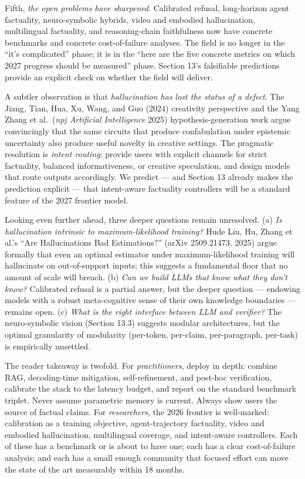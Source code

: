 Fifth, \emph{the open problems have sharpened}. Calibrated refusal, long-horizon agent factuality, neuro-symbolic hybrids, video and embodied hallucination, multilingual factuality, and reasoning-chain faithfulness now have concrete benchmarks and concrete cost-of-failure analyses. The field is no longer in the ``it's complicated'' phase; it is in the ``here are the five concrete metrics on which 2027 progress should be measured'' phase. Section 13's falsifiable predictions provide an explicit check on whether the field will deliver.

A subtler observation is that \emph{hallucination has lost the status of a defect}. The Jiang, Tian, Hua, Xu, Wang, and Guo (2024) creativity perspective and the Yang Zhang et al.~(\emph{npj Artificial Intelligence} 2025) hypothesis-generation work argue convincingly that the same circuits that produce confabulation under epistemic uncertainty also produce useful novelty in creative settings. The pragmatic resolution is \emph{intent routing}: provide users with explicit channels for strict factuality, balanced informativeness, or creative speculation, and design models that route outputs accordingly. We predict --- and Section 13 already makes the prediction explicit --- that intent-aware factuality controllers will be a standard feature of the 2027 frontier model.

Looking even further ahead, three deeper questions remain unresolved. (a) \emph{Is hallucination intrinsic to maximum-likelihood training?} Hude Liu, Hu, Zhang et al.'s ``Are Hallucinations Bad Estimations?'' (arXiv 2509.21473, 2025) argue formally that even an optimal estimator under maximum-likelihood training will hallucinate on out-of-support inputs; this suggests a fundamental floor that no amount of scale will breach. (b) \emph{Can we build LLMs that know what they don't know?} Calibrated refusal is a partial answer, but the deeper question --- endowing models with a robust meta-cognitive sense of their own knowledge boundaries --- remains open. (c) \emph{What is the right interface between LLM and verifier?} The neuro-symbolic vision (Section 13.3) suggests modular architectures, but the optimal granularity of modularity (per-token, per-claim, per-paragraph, per-task) is empirically unsettled.

The reader takeaway is twofold. For \emph{practitioners}, deploy in depth: combine RAG, decoding-time mitigation, self-refinement, and post-hoc verification, calibrate the stack to the latency budget, and report on the standard benchmark triplet. Never assume parametric memory is current. Always show users the source of factual claims. For \emph{researchers}, the 2026 frontier is well-marked: calibration as a training objective, agent-trajectory factuality, video and embodied hallucination, multilingual coverage, and intent-aware controllers. Each of these has a benchmark or is about to have one; each has a clear cost-of-failure analysis; and each has a small enough community that focused effort can move the state of the art measurably within 18 months.

